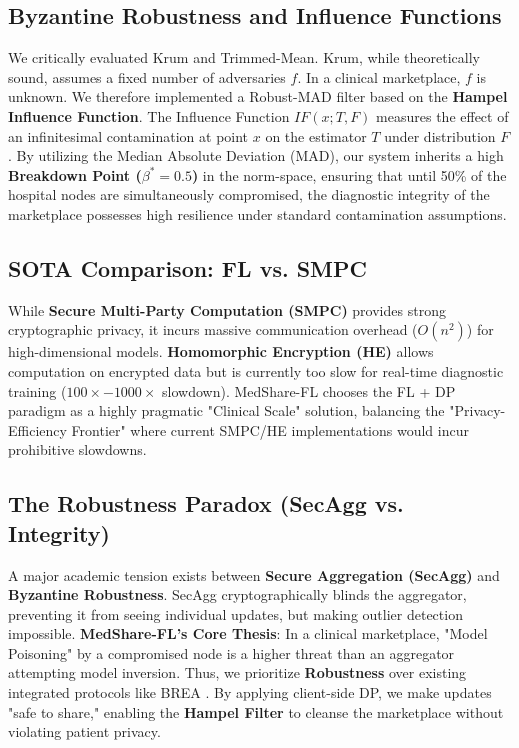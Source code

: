 \documentclass[10pt, a4paper, twocolumn]{article}
\begin{document}
\subsection{Byzantine Robustness and Influence Functions}
We critically evaluated Krum \cite{blanchard2017} and Trimmed-Mean. Krum, while theoretically sound, assumes a fixed number of adversaries $f$. In a clinical marketplace, $f$ is unknown. We therefore implemented a Robust-MAD filter based on the \textbf{Hampel Influence Function}. The Influence Function $IF(x; T, F)$ measures the effect of an infinitesimal contamination at point $x$ on the estimator $T$ under distribution $F$. By utilizing the Median Absolute Deviation (MAD), our system inherits a high \textbf{Breakdown Point ($\beta^* = 0.5$)} in the norm-space, ensuring that until 50\% of the hospital nodes are simultaneously compromised, the diagnostic integrity of the marketplace possesses high resilience under standard contamination assumptions.

\subsection{SOTA Comparison: FL vs. SMPC}
While \textbf{Secure Multi-Party Computation (SMPC)} provides strong cryptographic privacy, it incurs massive communication overhead ($O(n^2)$) for high-dimensional models. \textbf{Homomorphic Encryption (HE)} allows computation on encrypted data but is currently too slow for real-time diagnostic training ($100 \times - 1000 \times$ slowdown). MedShare-FL chooses the FL + DP paradigm as a highly pragmatic "Clinical Scale" solution, balancing the "Privacy-Efficiency Frontier" where current SMPC/HE implementations would incur prohibitive slowdowns.

\subsection{The Robustness Paradox (SecAgg vs. Integrity)}
A major academic tension exists between \textbf{Secure Aggregation (SecAgg)} \cite{bonawitz2017} and \textbf{Byzantine Robustness}. SecAgg cryptographically blinds the aggregator, preventing it from seeing individual updates, but making outlier detection impossible. \textbf{MedShare-FL’s Core Thesis}: In a clinical marketplace, "Model Poisoning" by a compromised node is a higher threat than an aggregator attempting model inversion. Thus, we prioritize \textbf{Robustness} over existing integrated protocols like BREA \cite{so2021}. By applying client-side DP, we make updates "safe to share," enabling the \textbf{Hampel Filter} \cite{hampel1974} to cleanse the marketplace without violating patient privacy.
\end{document}

